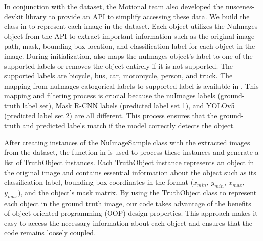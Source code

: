 In conjunction with the dataset, the Motional team also developed the nuscenes-devkit library to provide an API to simplify accessing these data. We build the  class in  to represent each image in the dataset. Each  object utilizes the NuImages object from the API to extract important information such as the original image path, mask, bounding box location, and classification label for each object in the image. During initialization,  also maps the nuImages object's label to one of the supported labels or removes the object entirely if it is not supported. The supported labels are bicycle, bus, car, motorcycle, person, and truck. The mapping from nuImages catogorical labels to supported label is available in . This mapping and filtering process is crucial because the nuImages labels (ground-truth label set), Mask R-CNN labels (predicted label set 1), and YOLOv5 (predicted label set 2) are all different. This process ensures that the ground-truth and predicted labels match if the model correctly detects the object.

After creating instances of the NuImageSample class with the extracted images from the dataset, the  function in  is used to process these instances and generate a list of TruthObject instances. Each TruthObject instance represents an object in the original image and contains essential information about the object such as its classification label, bounding box coordinates in the format ($x_{min}$, $y_{min}$, $x_{max}$, $y_{max}$), and the object's mask matrix. By using the TruthObject class to represent each object in the ground truth image, our code takes advantage of the benefits of object-oriented programming (OOP) design properties. This approach makes it easy to access the necessary information about each object and ensures that the code remains loosely coupled.